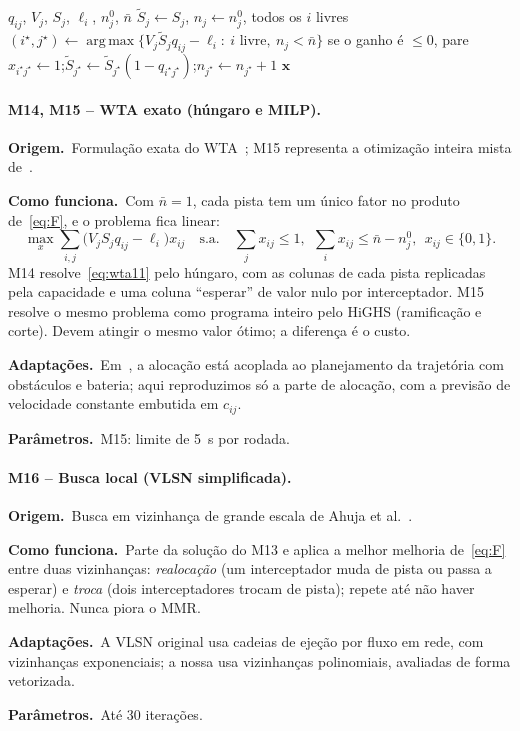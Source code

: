 \documentclass[11pt,a4paper]{article}
\newcommand{\orig}{\par\noindent\textbf{Origem.}~}
\newcommand{\func}{\par\noindent\textbf{Como funciona.}~}
\newcommand{\adap}{\par\noindent\textbf{Adaptações.}~}
\newcommand{\parm}{\par\noindent\textbf{Parâmetros.}~}
\DeclareMathOperator*{\argmax}{arg\,max}
\begin{document}
\begin{algorithm}[t]
\caption{Máximo retorno marginal (M13).}\label{alg:mmr}
\begin{algorithmic}[1]
\Require $q_{ij}$, $V_j$, $S_j$, $\ell_i$, $n_j^0$, $\bar n$
\State $\tilde S_j\gets S_j$, $n_j\gets n_j^0$, todos os $i$ livres
\Loop
  \State $(i^\star,j^\star)\gets\argmax\{V_j\tilde S_jq_{ij}-\ell_i:\ i\text{ livre},\ n_j<\bar n\}$
  \State se o ganho é $\le0$, pare
  \State $x_{i^\star j^\star}\gets1$;\quad $\tilde S_{j^\star}\gets\tilde S_{j^\star}(1-q_{i^\star j^\star})$;\quad $n_{j^\star}\gets n_{j^\star}+1$
\EndLoop
\Ensure $\bm{x}$
\end{algorithmic}
\end{algorithm}

\paragraph{M14, M15 -- WTA exato (húngaro e MILP).}
\orig Formulação exata do WTA~\cite{ahuja2007}; M15 representa a otimização inteira mista
de~\cite{afonso2020,cruz2025}.
\func Com $\bar n=1$, cada pista tem um único fator no produto de~\eqref{eq:F}, e o problema fica linear:
\begin{equation}
  \max_{x}\sum_{i,j}\big(V_jS_jq_{ij}-\ell_i\big)x_{ij}\quad\text{s.a.}\quad\sum_jx_{ij}\le1,\ \ \sum_ix_{ij}\le\bar n-n_j^0,\ \
  x_{ij}\in\{0,1\}.
  \label{eq:wta11}
\end{equation}
M14 resolve~\eqref{eq:wta11} pelo húngaro, com as colunas de cada pista replicadas pela capacidade e uma coluna
``esperar'' de valor nulo por interceptador. M15 resolve o mesmo problema como programa inteiro pelo HiGHS (ramificação
e corte). Devem atingir o mesmo valor ótimo; a diferença é o custo.
\adap Em~\cite{cruz2025}, a alocação está acoplada ao planejamento da trajetória com obstáculos e bateria; aqui
reproduzimos só a parte de alocação, com a previsão de velocidade constante embutida em $c_{ij}$.
\parm M15: limite de 5~s por rodada.

\paragraph{M16 -- Busca local (VLSN simplificada).}
\orig Busca em vizinhança de grande escala de Ahuja et al.~\cite{ahuja2007}.
\func Parte da solução do M13 e aplica a melhor melhoria de~\eqref{eq:F} entre duas vizinhanças: \emph{realocação} (um
interceptador muda de pista ou passa a esperar) e \emph{troca} (dois interceptadores trocam de pista); repete até não
haver melhoria. Nunca piora o MMR.
\adap A VLSN original usa cadeias de ejeção por fluxo em rede, com vizinhanças exponenciais; a nossa usa vizinhanças
polinomiais, avaliadas de forma vetorizada.
\parm Até 30 iterações.
\end{document}

